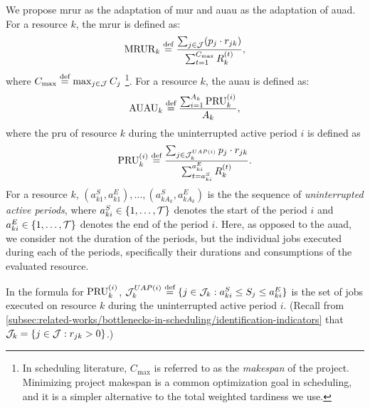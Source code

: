 We propose \acf{mrur} as the adaptation of \ac{mur} and \acf{auau} as the adaptation of \ac{auad}.
For a resource $k$, the \ac{mrur} is defined as:
$$
\indMRUR{k} \defeq \frac{\sum_{j \in \Jobs} (\duration{j} \cdot \consumption{j}{k})}%
                        {\sum_{t=1}^{C_{\max}} \capacity{k}{t}},
$$
where $C_{\max} \overset{\text{def}}{=} \max_{j \in \mathcal{J}} C_{j}$%
\footnote{In scheduling literature,
$C_{\max}$ is referred to as the \emph{makespan} of the project.
Minimizing project makespan is a common optimization goal in scheduling,
and it is a simpler alternative to the total weighted tardiness we use.}.
For a resource $k$, the \ac{auau} is defined as:
$$
\indAUAU{k} \defeq \frac{\sum_{i=1}^{A_k} \indPRU{k}{i}}%
                        {A_k},
$$
where the \acf{pru} of resource $k$ during the uninterrupted active period $i$
is defined as
$$
\indPRU{k}{i} \defeq \frac{\sum_{j \in \JobsOnResourceInPeriod{k}{i}}
                                \duration{j} \cdot \consumption{j}{k}}%
                          {\sum_{t=a_{ki}^{S}}^{a_{ki}^{E}} \capacity{k}{t} }.
$$
For a resource $k$,
$(a_{k1}^{S}, a_{k1}^{E}), \dots, (a_{kA_k}^{S}, a_{kA_k}^{E})$
is the the sequence of \emph{uninterrupted active periods},
where $a_{ki}^{S} \in \{{1}, \dots, {\mathcal{T}}\}$ denotes the start of the period $i$
and $a_{ki}^{E} \in \{{1}, \dots, {\mathcal{T}}\}$ denotes the end of the period $i$.
Here, as opposed to the \ac{auad},
we consider not the duration of the periods,
but the individual jobs executed during each of the periods,
specifically their durations and consumptions of the evaluated resource.

In the formula for $\operatorname{PRU}_{k}^{(i)}$,
$\mathcal{J}_{k}^{UAP(i)} \overset{\text{def}}{=} \{ j \in \mathcal{J}_{k} : a_{ki}^{S} \leq S_{j} \leq a_{ki}^{E} \}$
is the set of jobs executed on resource $k$ during the uninterrupted active period $i$.
(Recall from \cref{subsec:related-works/bottlenecks-in-scheduling/identification-indicators} that
$\mathcal{J}_{k} = \{ j \in \mathcal{J} : r_{j k} > 0 \}$.)

